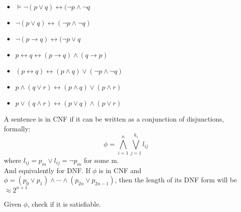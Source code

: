 {
        \begin{itemize}
                \item $ \vDash \neg (p \vee  q) \leftrightarrow (\neg p \wedge \neg q$
                \item $\neg (p \vee  q) \leftrightarrow (\neg p \wedge \neg q)$
                \item $\neg (p \rightarrow q) \leftrightarrow (\neg p \vee  q$ 
                \item $p \leftrightarrow  q \leftrightarrow ( p \rightarrow q) \wedge (q \rightarrow p)$
                \item $ (p \leftrightarrow q) \leftrightarrow (p \wedge q) \vee ( \neg p \wedge \neg q)$
                \item $p \wedge ( q \vee r) \leftrightarrow (p \wedge q) \vee (p \wedge  r)$
                \item $p \vee  (q \wedge r) \leftrightarrow (p \vee  q) \wedge  ( p \vee  r)$
                
        \end{itemize}
}

{
        A sentence is in CNF if it can be written as a conjunction of disjunctions, formally:
        \begin{equation}
                \phi = \bigwedge_{i = 1}^{n} \bigvee_{j=1}^{k_i} l_{ij} 
        \end{equation}
        where $l_{ij} = p_m \vee l_{ij} = \neg p_m$ for some m.\\
        And equivalently for DNF.
}
\nt
{
        If $ \phi $ is in CNF and $ \phi = (p_0 \vee p_1)\wedge \cdots \wedge  (p_{2n} \vee p_{2n-1})$, then the length of its DNF form will be $\approx 2^{n+1}$ 
}

{
        Given $ \phi$, check if it is satisfiable.
}


